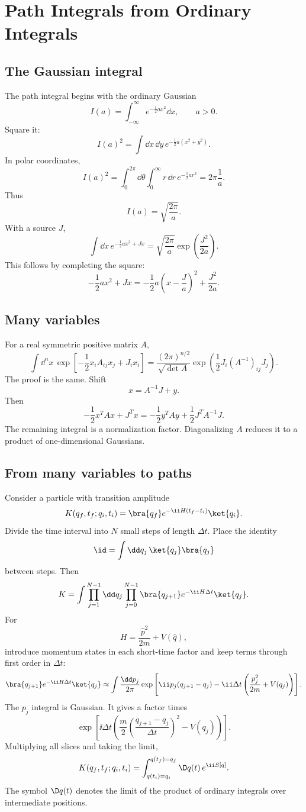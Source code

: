 \chapter{Path Integrals from Ordinary Integrals}

\section{The Gaussian integral}

The path integral begins with the ordinary Gaussian
\[
  I(a)=\int_{-\infty}^{\infty}e^{-\frac12ax^2}\dd x,
  \qquad a>0.
\]
Square it:
\[
  I(a)^2=\int\dd x\,\dd y\,e^{-\frac12a(x^2+y^2)}.
\]
In polar coordinates,
\[
  I(a)^2
  =
  \int_0^{2\pi}\dd\theta\int_0^\infty r\,\dd r\,e^{-\frac12ar^2}
  =
  2\pi\frac1a.
\]
Thus
\[
  I(a)=\sqrt{\frac{2\pi}{a}}.
\]
With a source \(J\),
\[
  \int\dd x\,e^{-\frac12ax^2+Jx}
  =
  \sqrt{\frac{2\pi}{a}}\exp\left(\frac{J^2}{2a}\right).
\]
This follows by completing the square:
\[
  -\frac12a x^2+Jx
  =
  -\frac12a\left(x-\frac Ja\right)^2+\frac{J^2}{2a}.
\]

\section{Many variables}

For a real symmetric positive matrix \(A\),
\[
  \int\dd^n x\,
  \exp\left[-\frac12x_iA_{ij}x_j+J_ix_i\right]
  =
  \frac{(2\pi)^{n/2}}{\sqrt{\det A}}
  \exp\left(\frac12J_i(A^{-1})_{ij}J_j\right).
\]
The proof is the same.  Shift
\[
  x=A^{-1}J+y.
\]
Then
\[
  -\frac12x^TAx+J^Tx
  =
  -\frac12y^TAy+\frac12J^TA^{-1}J.
\]
The remaining integral is a normalization factor.  Diagonalizing \(A\) reduces it to a product of one-dimensional Gaussians.

\section{From many variables to paths}

Consider a particle with transition amplitude
\[
  K(q_f,t_f;q_i,t_i)=\bra{q_f}e^{-\ii H(t_f-t_i)}\ket{q_i}.
\]
Divide the time interval into \(N\) small steps of length \(\Delta t\).  Place the identity
\[
  \id=\int\dd q_j\,\ket{q_j}\bra{q_j}
\]
between steps.  Then
\[
  K=\int\prod_{j=1}^{N-1}\dd q_j
  \prod_{j=0}^{N-1}
  \bra{q_{j+1}}e^{-\ii H\Delta t}\ket{q_j}.
\]
For
\[
  H=\frac{\hat p^2}{2m}+V(\hat q),
\]
introduce momentum states in each short-time factor and keep terms through first order in \(\Delta t\):
\[
  \bra{q_{j+1}}e^{-\ii H\Delta t}\ket{q_j}
  \approx
  \int\frac{\dd p_j}{2\pi}
  \exp\left[
  \ii p_j(q_{j+1}-q_j)
  -\ii\Delta t\left(\frac{p_j^2}{2m}+V(q_j)\right)
  \right].
\]
The \(p_j\) integral is Gaussian.  It gives a factor times
\[
  \exp\left[
  \ii\Delta t
  \left(
  \frac{m}{2}\left(\frac{q_{j+1}-q_j}{\Delta t}\right)^2
  -V(q_j)
  \right)
  \right].
\]
Multiplying all slices and taking the limit,
\[
  K(q_f,t_f;q_i,t_i)
  =
  \int_{q(t_i)=q_i}^{q(t_f)=q_f}\D q(t)\,e^{\ii S[q]}.
\]
The symbol \(\D q(t)\) denotes the limit of the product of ordinary integrals over intermediate positions.

